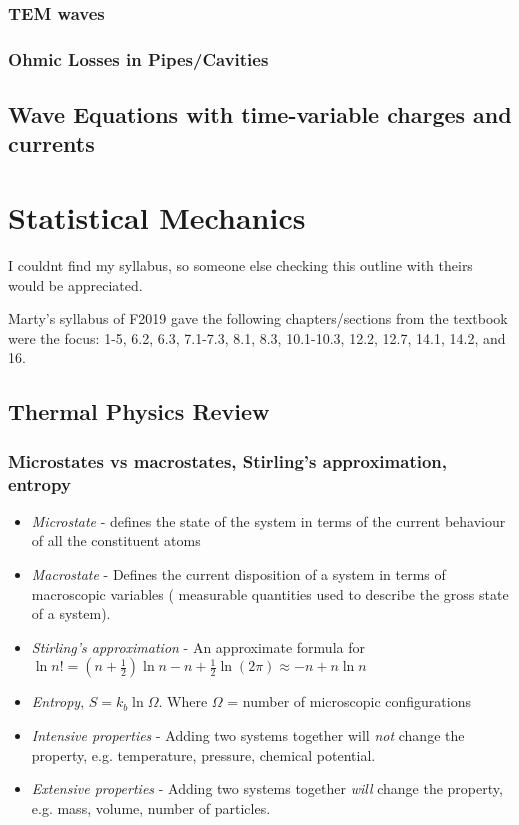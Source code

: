 \documentclass[]{article}
\begin{document}
\subsubsection{TEM waves}
\subsubsection{Ohmic Losses in Pipes/Cavities}

\subsection{Wave Equations with time-variable charges and currents}

\pagebreak
\section{Statistical Mechanics}
I couldnt find my syllabus, so someone else checking this outline with theirs would be appreciated.

Marty's syllabus of F2019 gave the following chapters/sections from the textbook were the focus: 1-5, 6.2, 6.3, 7.1-7.3, 8.1, 8.3, 10.1-10.3, 12.2, 12.7, 14.1, 14.2, and 16.


\subsection{Thermal Physics Review}
\subsubsection{Microstates vs macrostates, Stirling's approximation, entropy}
\begin{itemize}
    \item \emph{Microstate} - defines the state of the system in terms of the current behaviour of all the constituent atoms
    \item \emph{Macrostate} - Defines the current disposition of a system in terms of macroscopic variables ( measurable quantities used to describe the gross state of a system).
    \item \emph{Stirling's approximation} - An approximate formula for $\ln{n}!= (n+\frac{1}{2})\ln{n}-n+\frac{1}{2}\ln({2\pi})\approx -n+ n\ln{n}$
    \item \emph{Entropy}, $S = k_b \ln \Omega$. Where $\Omega$	=	number of microscopic configurations
    \item \emph{Intensive properties} - Adding two systems together will \emph{not} change the property, e.g. temperature, pressure, chemical potential. 
    \item \emph{Extensive properties} - Adding two systems together \emph{will} change the property, e.g. mass, volume, number of particles. 
\end{itemize}
\end{document}
